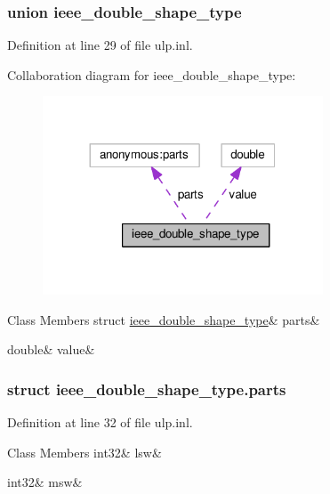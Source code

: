 \subsubsection{union ieee\+\_\+double\+\_\+shape\+\_\+type}


Definition at line 29 of file ulp.\+inl.



Collaboration diagram for ieee\+\_\+double\+\_\+shape\+\_\+type\+:
\nopagebreak
\begin{figure}[H]
\begin{center}
\leavevmode
\includegraphics[width=236pt]{de/dd4/unionieee__double__shape__type__coll__graph}
\end{center}
\end{figure}
\begin{DoxyFields}{Class Members}
\mbox{\label{ulp_8inl_af07d7842d3604ba30304c8a17bdfa3ff}} 
struct \hyperlink{ulp_8inl_d3/d26/structieee__double__shape__type_8parts}{ieee\_double\_shape\_type}&
parts&
\\
\hline

\mbox{\label{ulp_8inl_a2d9c4cab9e3fa74e4be6d72f798a145b}} 
double&
value&
\\
\hline

\end{DoxyFields}
\label{structieee__double__shape__type_8parts}
\subsubsection{struct ieee\+\_\+double\+\_\+shape\+\_\+type.\+parts}


Definition at line 32 of file ulp.\+inl.

\begin{DoxyFields}{Class Members}
\mbox{\label{ulp_8inl_a45629f7a7509bf9f743bf0a0004b3ee4}} 
int32&
lsw&
\\
\hline

\mbox{\label{ulp_8inl_a3d0272e1f71768b309817c93e9a59c70}} 
int32&
msw&
\\
\hline

\end{DoxyFields}


